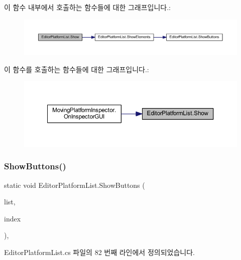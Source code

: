 이 함수 내부에서 호출하는 함수들에 대한 그래프입니다.\+:\nopagebreak
\begin{figure}[H]
\begin{center}
\leavevmode
\includegraphics[width=350pt]{df/d7a/class_editor_platform_list_afa78a25fbabdf962ead1dfefbddf50fd_cgraph}
\end{center}
\end{figure}
이 함수를 호출하는 함수들에 대한 그래프입니다.\+:\nopagebreak
\begin{figure}[H]
\begin{center}
\leavevmode
\includegraphics[width=350pt]{df/d7a/class_editor_platform_list_afa78a25fbabdf962ead1dfefbddf50fd_icgraph}
\end{center}
\end{figure}
\mbox{\label{class_editor_platform_list_ae482c7e2b601a4f6906ef4dccd25afab}} 
\subsubsection{\texorpdfstring{ShowButtons()}{ShowButtons()}}
{\footnotesize\ttfamily static void Editor\+Platform\+List.\+Show\+Buttons (\begin{DoxyParamCaption}\item[{Serialized\+Property}]{list,  }\item[{int}]{index }\end{DoxyParamCaption})\hspace{0.3cm}{\ttfamily [static]}, {\ttfamily [private]}}



Editor\+Platform\+List.\+cs 파일의 82 번째 라인에서 정의되었습니다.


